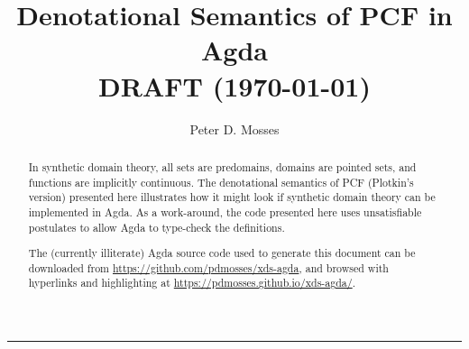 \documentclass[a4paper]{easychair}
\title{Denotational Semantics of PCF in Agda \\[2ex]
\normalsize DRAFT (\today)}
\author{
Peter D. Mosses%
}
\institute{
  Delft University of Technology, The Netherlands
  \\
  \email{p.d.mosses@tudelft.nl}
\\
   Swansea University, United Kingdom
 }
\begin{document}
\maketitle

\begin{abstract}
In synthetic domain theory, all sets are predomains, domains are pointed sets, and functions are implicitly continuous.
The denotational semantics of PCF (Plotkin's version) presented here illustrates how it might look if synthetic domain theory can be implemented in Agda.
As a work-around, the code presented here uses unsatisfiable postulates to allow Agda to type-check the definitions.

The (currently illiterate) Agda source code used to generate this document can be downloaded from
\url{https://github.com/pdmosses/xds-agda}, and browsed with hyperlinks and highlighting at
\url{https://pdmosses.github.io/xds-agda/}.
\end{abstract}


\bigskip\hrule\bigskip



\clearpage

\clearpage

\clearpage

\clearpage

\clearpage

\clearpage

\clearpage



%
\end{document}
